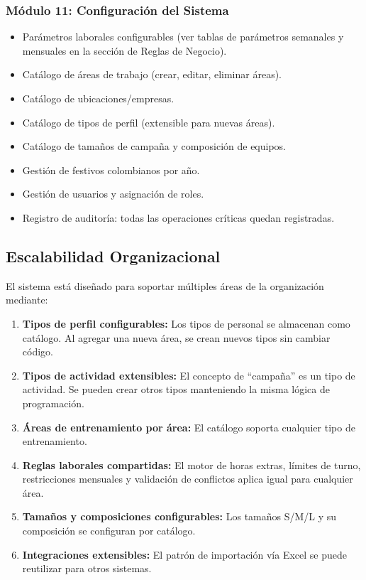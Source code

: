 \documentclass[10pt,a4paper]{article}
\begin{document}
\subsubsection{M\'{o}dulo 11: Configuraci\'{o}n del Sistema}
\begin{itemize}[leftmargin=2em]
    \item Par\'{a}metros laborales configurables (ver tablas de par\'{a}metros semanales y mensuales en la secci\'{o}n de Reglas de Negocio).
    \item Cat\'{a}logo de \'{a}reas de trabajo (crear, editar, eliminar \'{a}reas).
    \item Cat\'{a}logo de ubicaciones/empresas.
    \item Cat\'{a}logo de tipos de perfil (extensible para nuevas \'{a}reas).
    \item Cat\'{a}logo de tamaños de campaña y composici\'{o}n de equipos.
    \item Gesti\'{o}n de festivos colombianos por año.
    \item Gesti\'{o}n de usuarios y asignaci\'{o}n de roles.
    \item Registro de auditor\'{i}a: todas las operaciones cr\'{i}ticas quedan registradas.
\end{itemize}

\subsection{Escalabilidad Organizacional}

El sistema est\'{a} diseñado para soportar m\'{u}ltiples \'{a}reas de la organizaci\'{o}n mediante:

\begin{enumerate}[leftmargin=2em]
    \item \textbf{Tipos de perfil configurables:} Los tipos de personal se almacenan como cat\'{a}logo. Al agregar una nueva \'{a}rea, se crean nuevos tipos sin cambiar c\'{o}digo.
    \item \textbf{Tipos de actividad extensibles:} El concepto de ``campaña'' es un tipo de actividad. Se pueden crear otros tipos manteniendo la misma l\'{o}gica de programaci\'{o}n.
    \item \textbf{\'{A}reas de entrenamiento por \'{a}rea:} El cat\'{a}logo soporta cualquier tipo de entrenamiento.
    \item \textbf{Reglas laborales compartidas:} El motor de horas extras, l\'{i}mites de turno, restricciones mensuales y validaci\'{o}n de conflictos aplica igual para cualquier \'{a}rea.
    \item \textbf{Tamaños y composiciones configurables:} Los tamaños S/M/L y su composici\'{o}n se configuran por cat\'{a}logo.
    \item \textbf{Integraciones extensibles:} El patr\'{o}n de importaci\'{o}n v\'{i}a Excel se puede reutilizar para otros sistemas.
\end{enumerate}
\end{document}
